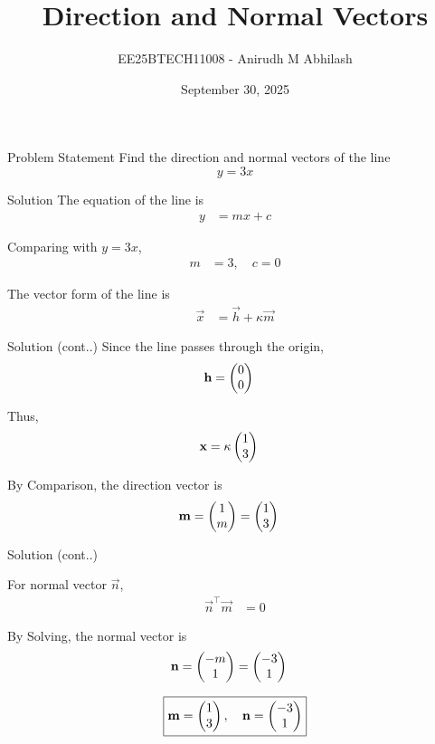 \documentclass{beamer}
\title{Direction and Normal Vectors}
\author{EE25BTECH11008 - Anirudh M Abhilash}
\date{September 30, 2025}
\begin{document}
\begin{frame}
\titlepage
\end{frame}

\begin{frame}{Problem Statement}
Find the direction and normal vectors of the line
\[
y = 3x
\]
\end{frame}

\begin{frame}{Solution}
The equation of the line is
\begin{align}
y &= mx + c \label{eq:genline}
\end{align}

Comparing with $y = 3x$,  
\begin{align}
m &= 3, \quad c = 0
\end{align}

The vector form of the line is
\begin{align}
\vec{x} &= \vec{h} + \kappa \vec{m} \label{eq:vectorform}
\end{align}
\end{frame}

\begin{frame}{Solution (cont..)}
Since the line passes through the origin,
\begin{align}
\mathbf{h} &= \begin{pmatrix}0 \\ 0\end{pmatrix}
\end{align}

Thus,
\begin{align}
\mathbf{x} &= \kappa \begin{pmatrix}1 \\ 3\end{pmatrix}
\end{align}

By Comparison, the direction vector is
\begin{align}
\mathbf{m} &= \begin{pmatrix}1 \\ m\end{pmatrix} = \begin{pmatrix}1 \\ 3\end{pmatrix}
\end{align}
\end{frame}

\begin{frame}{Solution (cont..)}

For normal vector $\vec{n}$, 
\begin{align}
\vec{n}^\top \vec{m} &= 0
\end{align}

By Solving, the normal vector is
\begin{align}
\mathbf{n} &= \begin{pmatrix}-m \\ 1\end{pmatrix} = \begin{pmatrix}-3 \\ 1\end{pmatrix}
\end{align}

\[
\boxed{\mathbf{m} = \begin{pmatrix}1 \\ 3\end{pmatrix}, \quad \mathbf{n} = \begin{pmatrix}-3 \\ 1\end{pmatrix}}
\]
\end{frame}
\end{document}
